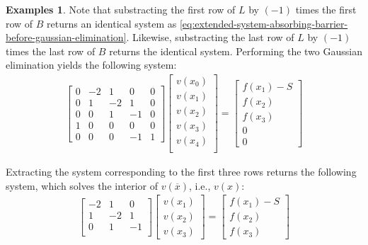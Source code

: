\documentclass[11pt]{article}
\theoremstyle{definition}
\newtheorem{example}{Examples}[section]
\begin{document}
\begin{example}
	Note that substracting the first row of ${L}$ by $(-1)$ times the first row of $B$ returns an identical system as \eqref{eq:extended-system-absorbing-barrier-before-gaussian-elimination}. Likewise, substracting the last row of ${L}$ by $(-1)$ times the last row of $B$ returns the identical system. Performing the two Gaussian elimination yields the following system:
	\begin{align}\label{eq:extended-system-absorbing-barrier-after-gaussian-elimination}
	\begin{bmatrix}
	0 & -2 & 1 & 0 & 0 \\
	0 & 1 & -2 & 1 & 0 \\
	0 & 0 & 1 & -1 & 0 \\
	1 & 0  & 0 & 0 & 0 \\
	0 & 0 & 0 & -1 & 1
	\end{bmatrix} 	  \begin{bmatrix}
	v(x_0) \\
	v(x_1) \\
	v(x_2) \\
	v(x_3) \\
	v(x_4) \\
	\end{bmatrix}
	=
	\begin{bmatrix}
	f(x_1) - S \\
	f(x_2) \\
	f(x_3) \\
	0 \\
	0
	\end{bmatrix}
	\end{align}

	Extracting the system corresponding to the first three rows returns the following system, which solves the interior of $v(\overline{x})$, i.e., $v(x)$:
	\begin{align}
	\begin{bmatrix}
	-2 & 1 & 0  \\
	1 & -2 & 1 \\
	0 & 1 & -1 \\
	\end{bmatrix} 	  \begin{bmatrix}
	v(x_1) \\
	v(x_2) \\
	v(x_3)
	\end{bmatrix}
	=
	\begin{bmatrix}
	f(x_1) - S \\
	f(x_2) \\
	f(x_3)
	\end{bmatrix}
	\end{align}
\end{example}
\end{document}
